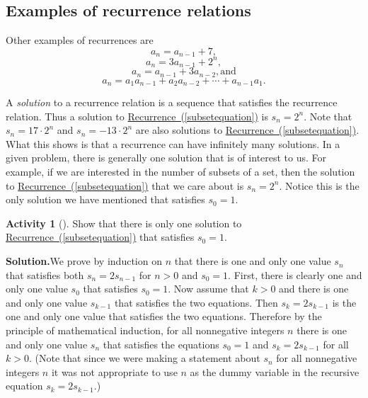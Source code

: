 \documentclass[10pt,]{book}
\theoremstyle{plain}
\theoremstyle{definition}
\newtheorem{activity}[project]{Activity}
\numberwithin{equation}{chapter}
\begin{document}
\subsection[{Examples of recurrence relations}]{Examples of recurrence relations}\label{subsection-17}
Other examples of recurrences are%
\begin{equation}
a_n = a_{n-1} +
7,\label{arithmeticexample}
\end{equation}
%
\begin{equation}
a_n =3a_{n-1} + 2^n,\label{geometricdriven}
\end{equation}
%
\begin{equation}
a_n = a_{n-1} + 3a_{n-2},\mbox{
and}\label{secondorderlinear}
\end{equation}
%
\begin{equation}
a_n= a_1a_{n-1} + a_2a_{n-2}+\cdots +
a_{n-1}a_1.\label{Catalanrecurrence}
\end{equation}
%
\par
A \emph{solution} to a recurrence relation is a sequence that satisfies the recurrence relation. Thus a solution to \hyperref[subsetequation]{Recurrence~(\ref{subsetequation})} is \(s_n =2^n\). Note that \(s_n=17\cdot2^n\) and \(s_n=-13\cdot2^n\) are also solutions to \hyperref[subsetequation]{Recurrence~(\ref{subsetequation})}. What this shows is that a recurrence can have infinitely many solutions. In a given problem, there is generally one solution that is of interest to us. For example, if we are interested in the number of subsets of a set, then the solution to \hyperref[subsetequation]{Recurrence~(\ref{subsetequation})} that we care about is \(s_n=2^n\). Notice this is the only solution we have mentioned that satisfies \(s_0=1\).%
\begin{activity}[]\label{activity-84}
Show that there is only one solution to \hyperref[subsetequation]{Recurrence~(\ref{subsetequation})} that satisfies \(s_0=1\).%
\par\medskip\noindent%
\textbf{Solution.}\quad We prove by induction on \(n\) that there is one and only one value \(s_n\) that satisfies both \(s_n=2s_{n-1}\) for \(n>0\) and \(s_0=1\). First, there is clearly one and only one value \(s_0\) that satisfies \(s_0=1\). Now assume that \(k>0\) and there is one and only one value \(s_{k-1}\) that satisfies the two equations. Then \(s_k=2s_{k-1}\) is the one and only one value that satisfies the two equations. Therefore by the principle of mathematical induction, for all nonnegative integers \(n\) there is one and only one value \(s_n\) that satisfies the equations \(s_0=1\) and \(s_k=2s_{k-1}\) for all \(k>0\). (Note that since we were making a statement about \(s_n\) for all nonnegative integers \(n\) it was not appropriate to use \(n\) as the dummy variable in the recursive equation \(s_k=2s_{k-1}\).)%
\end{activity}
\end{document}
